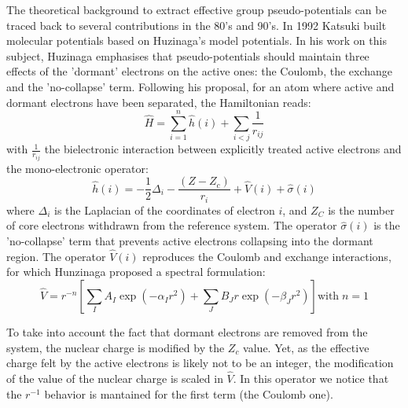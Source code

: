 \documentclass[journal=jctcce,manuscript=article]{achemso}
\begin{document}
The theoretical background to extract effective group pseudo-potentials  can be traced back 
to several contributions in the 80's and  90's.\cite{Nicolas1980a, huzinaga_effective_1991, huzinaga_1994_1995}
In 1992 Katsuki built molecular potentials based on Huzinaga's model potentials.\cite{katsuki_molecular_1992,katsuki_spectral_1993}
 In his work on this subject, Huzinaga emphasises that pseudo-potentials should maintain three effects of the
'dormant' electrons on the active ones: the Coulomb, the exchange and the 'no-collapse' term.\cite{huzinaga_effective_1991}
Following his proposal, for an atom where active and dormant electrons have been separated, the Hamiltonian reads:
\begin{equation}
\label{eq:atomicHamiltonian}
\hat{H} = \sum_{i=1}^n \hat{h}(i) +\sum_{i<j}\frac{1}{r_{ij}}
\end{equation}
with $\frac{1}{r_{ij}}$ the bielectronic interaction
between explicitly treated active electrons and
the mono-electronic operator:
\begin{equation}
\label{eq:monoElectronicOperator}
\hat{h}(i) = -\frac{1}{2}\Delta_i - \frac{(Z-Z_c)}{r_i}+\hat{V}(i) + \hat{\sigma}(i)
\end{equation}
where $\Delta_i$ is the Laplacian of the coordinates of electron $i$, and 
$Z_C$ is the number of core electrons withdrawn from the reference system.
The operator $\hat{\sigma}(i)$ is the 'no-collapse' term that prevents active electrons
collapsing into the dormant region. The operator $\hat{V}(i)$ reproduces the 
Coulomb and exchange interactions, for which Hunzinaga proposed a spectral formulation:
\begin{equation}
\label{eq:HuzinagaMPVersion1Potential}
\hat{V} = r^{-n}\left[\sum_IA_I\exp(-\alpha_I r^2)+\sum_JB_Jr\exp(-\beta_J r^2)\right] \text{with}\;n=1
\end{equation}

To take into account the fact that dormant electrons are removed from the
system, the nuclear charge is modified by the $Z_c$ value.
Yet, as the effective charge felt by the active electrons is likely not to be an integer,
the modification of the value of the nuclear charge is scaled in $\hat{V}$.
In this operator we notice that the \(r^{-1}\) behavior is mantained for the first term 
(the Coulomb one).
\end{document}
